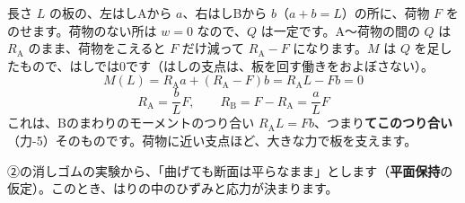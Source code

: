 \label{ph:力-10:hanryoku}長さ $L$ の板の、左はしAから $a$、右はしBから $b$（$a+b=L$）の所に、荷物 $F$ をのせます。荷物のない所は $w=0$ なので、$Q$ は一定です。A〜荷物の間の $Q$ は $R_{\mathrm A}$ のまま、荷物をこえると $F$ だけ減って $R_{\mathrm A}-F$ になります。$M$ は $Q$ を足したもので、はしでは0です（はしの支点は、板を回す働きをおよぼさない）。
\[ M(L)=R_{\mathrm A}a+(R_{\mathrm A}-F)b=R_{\mathrm A}L-Fb=0 \]
\[ R_{\mathrm A}=\frac{b}{L}F,\qquad R_{\mathrm B}=F-R_{\mathrm A}=\frac{a}{L}F \]
これは、Bのまわりのモーメントのつり合い $R_{\mathrm A}L=Fb$、つまり\textbf{てこのつり合い}（力-5）そのものです。荷物に近い支点ほど、大きな力で板を支えます。

\begin{phflow}
\end{phflow}

\label{ph:力-10:sec7}②の消しゴムの実験から、「曲げても断面は平らなまま」とします（\textbf{平面保持}の仮定）。このとき、はりの中のひずみと応力が決まります。
\begin{phmodel}[曲げられるはり]
\end{phmodel}

